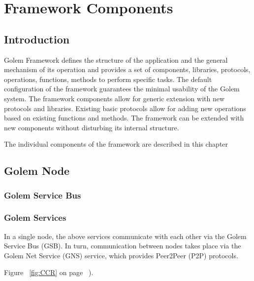 \section{Framework Components}

\subsection{Introduction}

Golem Framework defines the structure of the application and the general mechanism of its operation
and provides a set of components, libraries, protocols, operations, functions, methods to perform specific tasks.
The default configuration of the framework guarantees the minimal usability of the Golem system.
The framework components allow for generic extension with new protocols and libraries.
Existing basic protocols allow for adding new operations based on existing functions and methods.
The framework can be extended with new components without disturbing its internal structure.

The individual components of the framework are described in this chapter

\subsection{Golem Node}

\subsubsection{Golem Service Bus}



\subsubsection{Golem Services}


In a single node, the above services communicate with each other via the Golem Service Bus (GSB).
In turn, communication between nodes takes place via the Golem Net Service (GNS) service, which provides Peer2Peer (P2P) protocols.


Figure ~\ref{fig:CCR} on page ~\pageref{fig:CCR}).

